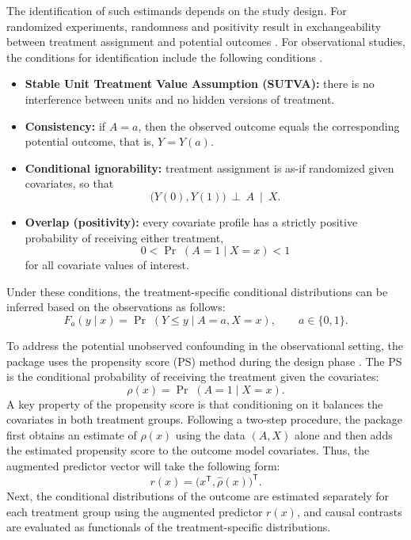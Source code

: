 \documentclass[preprint,12pt,authoryear]{elsarticle}
\begin{document}
The identification of such estimands depends on the study design. For randomized experiments, randomness and positivity result in exchangeability between treatment assignment and potential outcomes \citep{ImbensRubin2015}. For observational studies, the conditions for identification include the following conditions \citep{RosenbaumRubin1983,ImbensRubin2015}.

\begin{itemize}
\item \textbf{Stable Unit Treatment Value Assumption (SUTVA):} there
is no interference between units and no hidden versions of treatment.
\item \textbf{Consistency:} if $A=a$, then the observed outcome equals
the corresponding potential outcome, that is, $Y=Y(a)$.
\item \textbf{Conditional ignorability:} treatment assignment is
as-if randomized given covariates, so that
\begin{equation*}
\bigl(Y(0),Y(1)\bigr)\ \perp\ A \ \mid\ X.
\end{equation*}
\item \textbf{Overlap (positivity):} every covariate profile has a
strictly positive probability of receiving either treatment,
\begin{equation*}
0<\Pr\;(A=1\mid X=x)<1
\end{equation*}
for all covariate values of interest.
\end{itemize}
Under these conditions, the treatment-specific conditional
distributions can be inferred based on the observations as follows:
\begin{equation*}
F_a(y\mid x)=\Pr\;(Y\le y\mid A=a,X=x),\qquad a\in\{0,1\}.
\end{equation*}

To address the potential unobserved confounding in the observational
setting, the package uses the propensity score (PS) method during the
design phase \citep{RosenbaumRubin1983}.  The PS is the
conditional probability of receiving the treatment given the
covariates:
\begin{equation*}
\rho(x)=\Pr\;(A=1\mid X=x).
\end{equation*}
A key property of the propensity score is that
conditioning on it balances the covariates in both treatment groups.
Following a two-step procedure, the package first obtains an estimate
of $\rho(x)$ using the data $(A,X)$ alone and then adds the estimated
propensity score to the outcome model covariates. Thus, the
augmented predictor vector will take the following form:
\begin{equation*}
r(x)=\bigl(x^{\mathsf{T}},\widehat{\rho}(x)\bigr)^{\mathsf{T}}.
\end{equation*}
Next, the conditional distributions of the outcome are estimated
separately for each treatment group using the augmented predictor
$r(x)$, and causal contrasts are evaluated as functionals of the
treatment-specific distributions.
\end{document}
